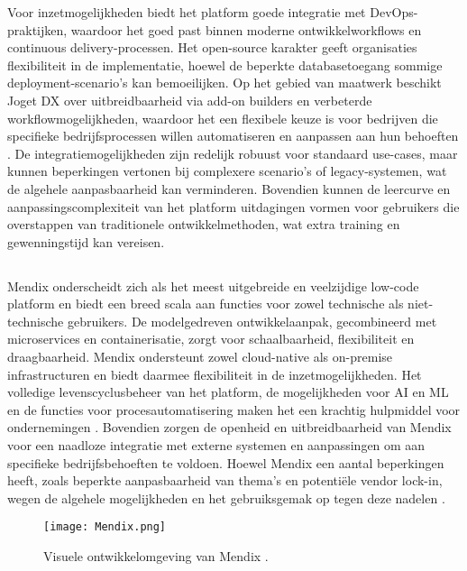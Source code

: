 Voor inzetmogelijkheden biedt het platform goede integratie met DevOps-praktijken, waardoor het goed past binnen moderne ontwikkelworkflows en continuous delivery-processen. Het open-source karakter geeft organisaties flexibiliteit in de implementatie, hoewel de beperkte databasetoegang sommige deployment-scenario's kan bemoeilijken. Op het gebied van maatwerk beschikt Joget DX over uitbreidbaarheid via add-on builders en verbeterde workflowmogelijkheden, waardoor het een flexibele keuze is voor bedrijven die specifieke bedrijfsprocessen willen automatiseren en aanpassen aan hun behoeften \autocite{Sido2024}. De integratiemogelijkheden zijn redelijk robuust voor standaard use-cases, maar kunnen beperkingen vertonen bij complexere scenario's of legacy-systemen, wat de algehele aanpasbaarheid kan verminderen. Bovendien kunnen de leercurve en aanpassingscomplexiteit van het platform uitdagingen vormen voor gebruikers die overstappen van traditionele ontwikkelmethoden, wat extra training en gewenningstijd kan vereisen.
\subsection{}
Mendix onderscheidt zich als het meest uitgebreide en veelzijdige low-code platform en biedt een breed scala aan functies voor zowel technische als niet-technische gebruikers. De modelgedreven ontwikkelaanpak, gecombineerd met microservices en containerisatie, zorgt voor schaalbaarheid, flexibiliteit en draagbaarheid. Mendix ondersteunt zowel cloud-native als on-premise infrastructuren en biedt daarmee flexibiliteit in de inzetmogelijkheden. Het volledige levenscyclusbeheer van het platform, de mogelijkheden voor \gls{AI} en \gls{ML} en de functies voor procesautomatisering maken het een krachtig hulpmiddel voor ondernemingen \autocite{Sido2024}. Bovendien zorgen de openheid en uitbreidbaarheid van Mendix voor een naadloze integratie met externe systemen en aanpassingen om aan specifieke bedrijfsbehoeften te voldoen. Hoewel Mendix een aantal beperkingen heeft, zoals beperkte aanpasbaarheid van thema's en potentiële vendor lock-in, wegen de algehele mogelijkheden en het gebruiksgemak op tegen deze nadelen \autocite{Sido2024}.

\begin{figure}[H]
    \centering
    \texttt{[image: Mendix.png]}
    \caption[Visuele ontwikkelomgeving Mendix]{\label{fig:Mendix} Visuele ontwikkelomgeving van Mendix \autocite{Mendix2025}.}
\end{figure}


